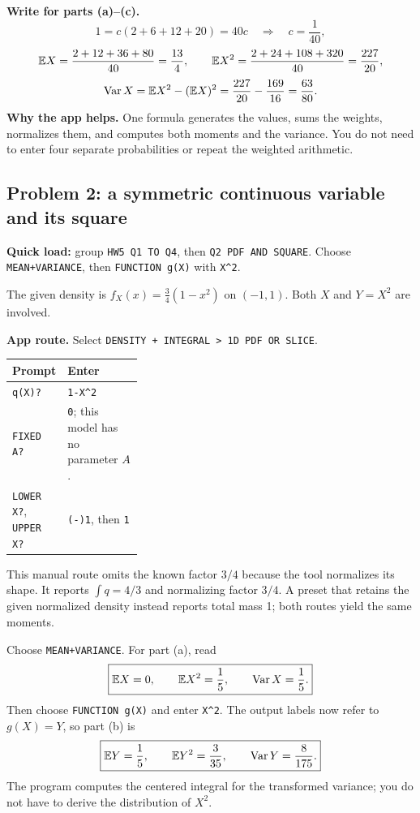 \textbf{Write for parts (a)--(c).}
\[
1=c(2+6+12+20)=40c\quad\Rightarrow\quad c=\frac1{40},
\]
\[
\mathbb E X=\frac{2+12+36+80}{40}=\frac{13}{4},\qquad
\mathbb E X^2=\frac{2+24+108+320}{40}=\frac{227}{20},
\]
\[
\operatorname{Var} X=\mathbb E X^2-(\mathbb E X)^2=\frac{227}{20}-\frac{169}{16}=\frac{63}{80}.
\]
\textbf{Why the app helps.} One formula generates the values, sums the weights, normalizes them, and computes both moments and the variance. You do not need to enter four separate probabilities or repeat the weighted arithmetic.

\subsection{Problem 2: a symmetric continuous variable and its square}
\textbf{Quick load:} group \texttt{HW5 Q1 TO Q4}, then \texttt{Q2 PDF AND SQUARE}. Choose \texttt{MEAN+VARIANCE}, then \texttt{FUNCTION g(X)} with \texttt{X\^{}2}.

The given density is $f_X(x)=\frac34(1-x^2)$ on $(-1,1)$. Both $X$ and $Y=X^2$ are involved.

\textbf{App route.} Select \texttt{DENSITY + INTEGRAL > 1D PDF OR SLICE}.
\begin{center}
\begin{tabularx}{\linewidth}{@{}p{0.32\linewidth}X@{}}
\toprule Prompt & Enter\\\midrule
\texttt{q(X)?} & \texttt{1-X\^{}2}\\
\texttt{FIXED A?} & \texttt{0}; this model has no parameter $A$.\\
\texttt{LOWER X?}, \texttt{UPPER X?} & \texttt{(-)1}, then \texttt{1}\\\bottomrule
\end{tabularx}
\end{center}
This manual route omits the known factor $3/4$ because the tool normalizes its shape. It reports $\int q=4/3$ and normalizing factor $3/4$. A preset that retains the given normalized density instead reports total mass 1; both routes yield the same moments.

Choose \texttt{MEAN+VARIANCE}. For part (a), read
\[
\boxed{\mathbb E X=0,\qquad \mathbb E X^2=\frac15,\qquad \operatorname{Var} X=\frac15.}
\]
Then choose \texttt{FUNCTION g(X)} and enter \texttt{X\^{}2}. The output labels now refer to $g(X)=Y$, so part (b) is
\[
\boxed{\mathbb E Y=\frac15,\qquad \mathbb E Y^2=\frac3{35},\qquad \operatorname{Var} Y=\frac8{175}.}
\]
The program computes the centered integral for the transformed variance; you do not have to derive the distribution of $X^2$.

